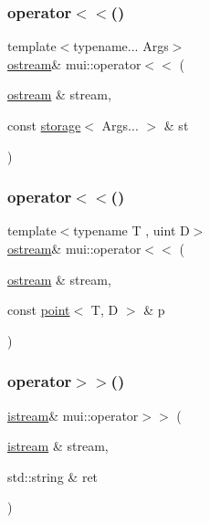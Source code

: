 \mbox{\label{namespacemui_ae1e6038082682fd4b840fcb58d9ae2e0}} 
\subsubsection{\texorpdfstring{operator$<$$<$()}{operator<<()}\hspace{0.1cm}{\footnotesize\ttfamily [20/21]}}
{\footnotesize\ttfamily template$<$typename... Args$>$ \\
\hyperlink{classmui_1_1ostream}{ostream}\& mui\+::operator$<$$<$ (\begin{DoxyParamCaption}\item[{\hyperlink{classmui_1_1ostream}{ostream} \&}]{stream,  }\item[{const \hyperlink{structmui_1_1storage}{storage}$<$ Args... $>$ \&}]{st }\end{DoxyParamCaption})}

\mbox{\label{namespacemui_a47ea1ee49c3674c72687a5c40786d3e0}} 
\subsubsection{\texorpdfstring{operator$<$$<$()}{operator<<()}\hspace{0.1cm}{\footnotesize\ttfamily [21/21]}}
{\footnotesize\ttfamily template$<$typename T , uint D$>$ \\
\hyperlink{classmui_1_1ostream}{ostream}\& mui\+::operator$<$$<$ (\begin{DoxyParamCaption}\item[{\hyperlink{classmui_1_1ostream}{ostream} \&}]{stream,  }\item[{const \hyperlink{structmui_1_1point}{point}$<$ T, D $>$ \&}]{p }\end{DoxyParamCaption})}





 



 \mbox{\label{namespacemui_a1a3a45788017c2540398d1ef559f47c4}} 
\subsubsection{\texorpdfstring{operator$>$$>$()}{operator>>()}\hspace{0.1cm}{\footnotesize\ttfamily [1/20]}}
{\footnotesize\ttfamily \hyperlink{classmui_1_1istream}{istream}\& mui\+::operator$>$$>$ (\begin{DoxyParamCaption}\item[{\hyperlink{classmui_1_1istream}{istream} \&}]{stream,  }\item[{std\+::string \&}]{ret }\end{DoxyParamCaption})\hspace{0.3cm}{\ttfamily [inline]}}

